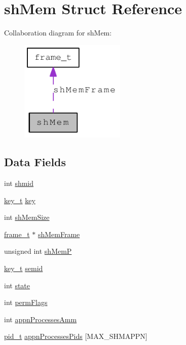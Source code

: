 \hypertarget{structsh_mem}{
\section{shMem Struct Reference}
\label{structsh_mem}
}


Collaboration diagram for shMem:\nopagebreak
\begin{figure}[H]
\begin{center}
\leavevmode
\includegraphics[width=142pt]{structsh_mem__coll__graph}
\end{center}
\end{figure}
\subsection*{Data Fields}
\begin{DoxyCompactItemize}
\item 
int \hyperlink{structsh_mem_ac8807d215d2ee6d9779d76aeb1147430}{shmid}
\item 
\hyperlink{types_8h_a158b5efbc244b8995c439d60c976c818}{key\_\-t} \hyperlink{structsh_mem_ac8861193246fc34d8f29ac9d57b6791a}{key}
\item 
int \hyperlink{structsh_mem_a43617d0cfffcc8578872707c8804b381}{shMemSize}
\item 
\hyperlink{structframe__t}{frame\_\-t} $\ast$ \hyperlink{structsh_mem_a21b32e7678691034a296926c350c2d62}{shMemFrame}
\item 
unsigned int \hyperlink{structsh_mem_af69f25548b68c95b9142a8cea59796bb}{shMemP}
\item 
\hyperlink{types_8h_a158b5efbc244b8995c439d60c976c818}{key\_\-t} \hyperlink{structsh_mem_a9222a19bf63a4f9775ec6307f10955ac}{semid}
\item 
int \hyperlink{structsh_mem_a89f234133d3efe315836311cbf21c64b}{state}
\item 
int \hyperlink{structsh_mem_a720a6e55514a9c4aee4b913a7f871c31}{permFlags}
\item 
int \hyperlink{structsh_mem_aab6ea7924dbc5e67cbf5923d4226ea91}{appnProcessesAmm}
\item 
\hyperlink{types_8h_ab612a3a4eb0e2ced1e55ecff76260458}{pid\_\-t} \hyperlink{structsh_mem_a5bb581de55dfe5f03f5b8b1646a93b38}{appnProcessesPids} \mbox{[}MAX\_\-SHMAPPN\mbox{]}
\end{DoxyCompactItemize}


